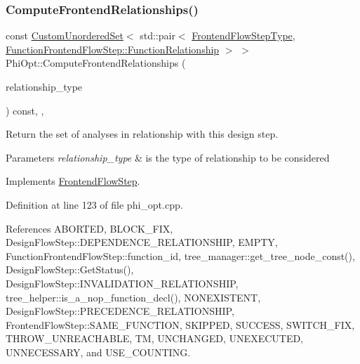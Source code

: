 \subsubsection{\texorpdfstring{Compute\+Frontend\+Relationships()}{ComputeFrontendRelationships()}}
{\footnotesize\ttfamily const \hyperlink{classCustomUnorderedSet}{Custom\+Unordered\+Set}$<$ std\+::pair$<$ \hyperlink{frontend__flow__step_8hpp_afeb3716c693d2b2e4ed3e6d04c3b63bb}{Frontend\+Flow\+Step\+Type}, \hyperlink{classFrontendFlowStep_af7cf30f2023e5b99e637dc2058289ab0}{Function\+Frontend\+Flow\+Step\+::\+Function\+Relationship} $>$ $>$ Phi\+Opt\+::\+Compute\+Frontend\+Relationships (\begin{DoxyParamCaption}\item[{const \hyperlink{classDesignFlowStep_a723a3baf19ff2ceb77bc13e099d0b1b7}{Design\+Flow\+Step\+::\+Relationship\+Type}}]{relationship\+\_\+type }\end{DoxyParamCaption}) const\hspace{0.3cm}{\ttfamily [override]}, {\ttfamily [private]}, {\ttfamily [virtual]}}



Return the set of analyses in relationship with this design step. 


\begin{DoxyParams}{Parameters}
{\em relationship\+\_\+type} & is the type of relationship to be considered \\
\hline
\end{DoxyParams}


Implements \hyperlink{classFrontendFlowStep_abeaff70b59734e462d347ed343dd700d}{Frontend\+Flow\+Step}.



Definition at line 123 of file phi\+\_\+opt.\+cpp.



References A\+B\+O\+R\+T\+ED, B\+L\+O\+C\+K\+\_\+\+F\+IX, Design\+Flow\+Step\+::\+D\+E\+P\+E\+N\+D\+E\+N\+C\+E\+\_\+\+R\+E\+L\+A\+T\+I\+O\+N\+S\+H\+IP, E\+M\+P\+TY, Function\+Frontend\+Flow\+Step\+::function\+\_\+id, tree\+\_\+manager\+::get\+\_\+tree\+\_\+node\+\_\+const(), Design\+Flow\+Step\+::\+Get\+Status(), Design\+Flow\+Step\+::\+I\+N\+V\+A\+L\+I\+D\+A\+T\+I\+O\+N\+\_\+\+R\+E\+L\+A\+T\+I\+O\+N\+S\+H\+IP, tree\+\_\+helper\+::is\+\_\+a\+\_\+nop\+\_\+function\+\_\+decl(), N\+O\+N\+E\+X\+I\+S\+T\+E\+NT, Design\+Flow\+Step\+::\+P\+R\+E\+C\+E\+D\+E\+N\+C\+E\+\_\+\+R\+E\+L\+A\+T\+I\+O\+N\+S\+H\+IP, Frontend\+Flow\+Step\+::\+S\+A\+M\+E\+\_\+\+F\+U\+N\+C\+T\+I\+ON, S\+K\+I\+P\+P\+ED, S\+U\+C\+C\+E\+SS, S\+W\+I\+T\+C\+H\+\_\+\+F\+IX, T\+H\+R\+O\+W\+\_\+\+U\+N\+R\+E\+A\+C\+H\+A\+B\+LE, TM, U\+N\+C\+H\+A\+N\+G\+ED, U\+N\+E\+X\+E\+C\+U\+T\+ED, U\+N\+N\+E\+C\+E\+S\+S\+A\+RY, and U\+S\+E\+\_\+\+C\+O\+U\+N\+T\+I\+NG.

